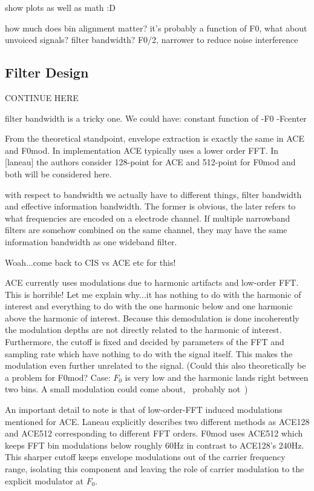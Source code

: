 \documentclass [11pt, proquest] {uwthesis}[2015/03/03]
\begin{document}
show plots as well as math :D

how much does bin alignment matter?  it's probably a function of F0, what about unvoiced signals?
filter bandwidth? F0/2, narrower to reduce noise interference


\subsection{Filter Design}

CONTINUE HERE

filter bandwidth is a tricky one.  We could have:
constant
function of
-F0
-Fcenter

From the theoretical standpoint, envelope extraction is exactly the same in ACE and F0mod.  In implementation ACE typically uses a lower order FFT.  In [laneau] the authors consider 128-point for ACE and 512-point for F0mod and both will be considered here.



        with respect to bandwidth we actually have to different things, filter bandwidth and effective information bandwidth.  The former is obvious, the later refers to what frequencies are encoded on a electrode channel.  If multiple narrowband filters are somehow combined on the same channel, they may have the same information bandwidth as one wideband filter.





Woah...come back to CIS vs ACE etc for this!

ACE currently uses modulations due to harmonic artifacts and low-order FFT.  This is horrible!  Let me explain why...it has nothing to do with the harmonic of interest and everything to do with the one harmonic below and one harmonic above the harmonic of interest.  Because this demodulation is done incoherently the modulation depths are not directly related to the harmonic of interest.  Furthermore, the cutoff is fixed and decided by parameters of the FFT and sampling rate which have nothing to do with the signal itself.  This makes the modulation even further unrelated to the signal.  (Could this also theoretically be a problem for F0mod?  Case: $F_0$ is very low and the harmonic lands right between two bins.  A small modulation could come about, ~probably not~)

An important detail to note is that of low-order-FFT induced modulations mentioned for ACE.  Laneau explicitly describes two different methods as ACE128 and ACE512 corresponding to different FFT orders.  F0mod uses ACE512 which keeps FFT bin modulations below roughly 60Hz in contrast to ACE128's 240Hz.  This sharper cutoff keeps envelope modulations out of the carrier frequency range, isolating this component and leaving the role of carrier modulation to the explicit modulator at $F_0$.
\end{document}
